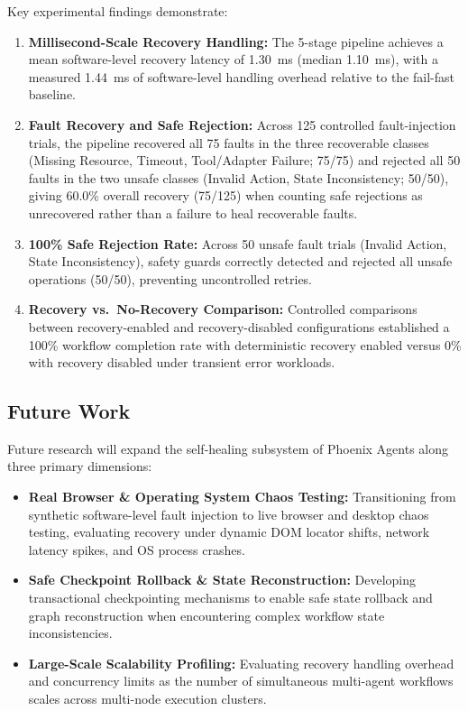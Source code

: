 \documentclass[conference]{IEEEtran}
\newcommand{\chg}[1]{{\color{blue}#1}}
\begin{document}
Key experimental findings demonstrate:
\begin{enumerate}
    \item \textbf{Millisecond-Scale Recovery Handling:} The 5-stage pipeline achieves a mean software-level recovery latency of 1.30~ms (median 1.10~ms), with a measured 1.44~ms of software-level handling overhead relative to the fail-fast baseline.
    \item \textbf{\chg{Fault Recovery and Safe Rejection:}} \chg{Across 125 controlled fault-injection trials, the pipeline recovered all 75 faults in the three recoverable classes (Missing Resource, Timeout, Tool/Adapter Failure; 75/75) and rejected all 50 faults in the two unsafe classes (Invalid Action, State Inconsistency; 50/50), giving 60.0\% overall recovery (75/125) when counting safe rejections as unrecovered rather than a failure to heal recoverable faults.}
    \item \textbf{100\% Safe Rejection Rate:} Across 50 unsafe fault trials (Invalid Action, State Inconsistency), safety guards correctly detected and rejected all unsafe operations (50/50), preventing uncontrolled retries.
    \item \textbf{Recovery vs.\ No-Recovery Comparison:} Controlled comparisons between recovery-enabled and recovery-disabled configurations established a 100\% workflow completion rate with deterministic recovery enabled versus 0\% with recovery disabled under transient error workloads.
\end{enumerate}

\subsection{Future Work}
Future research will expand the self-healing subsystem of Phoenix Agents along three primary dimensions:
\begin{itemize}
    \item \textbf{Real Browser \& Operating System Chaos Testing:} Transitioning from synthetic software-level fault injection to live browser and desktop chaos testing, evaluating recovery under dynamic DOM locator shifts, network latency spikes, and OS process crashes.
    \item \textbf{Safe Checkpoint Rollback \& State Reconstruction:} Developing transactional checkpointing mechanisms to enable safe state rollback and graph reconstruction when encountering complex workflow state inconsistencies.
    \item \textbf{Large-Scale Scalability Profiling:} Evaluating recovery handling overhead and concurrency limits as the number of simultaneous multi-agent workflows scales across multi-node execution clusters.
\end{itemize}
\end{document}
